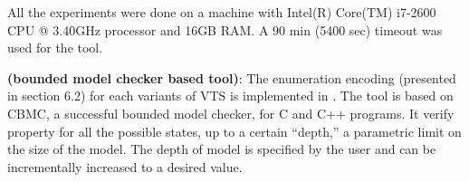 All the experiments were done
on a machine with Intel(R) Core(TM) i7-2600 CPU @ 3.40GHz processor and 16GB RAM.
%
A 90 min (5400 sec) timeout was used for the tool.

%

%

\textbf{{\sattool} (bounded model checker based tool)}:
The enumeration encoding (presented in section 6.2) for each variants of VTS is implemented in {\sattool}.
The tool is based on CBMC, a successful bounded model checker, for C and C++ programs. 
%
%
It verify property for all the possible states, up to a certain “depth,” a parametric limit on the size of the model.
%
The depth of model is specified by the user and can be  incrementally increased to a desired value.
%
%

